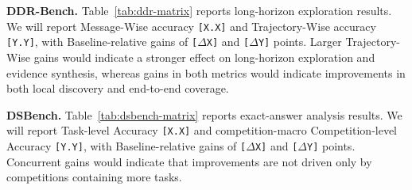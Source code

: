 \documentclass{article}
\begin{document}
\noindent\textbf{DDR-Bench.}
Table~\ref{tab:ddr-matrix} reports long-horizon exploration results.
We will report Message-Wise accuracy \texttt{[X.X]} and Trajectory-Wise accuracy \texttt{[Y.Y]}, with Baseline-relative gains of \texttt{[$\Delta$X]} and \texttt{[$\Delta$Y]} points.
Larger Trajectory-Wise gains would indicate a stronger effect on long-horizon exploration and evidence synthesis, whereas gains in both metrics would indicate improvements in both local discovery and end-to-end coverage.

\noindent\textbf{DSBench.}
Table~\ref{tab:dsbench-matrix} reports exact-answer analysis results.
We will report Task-level Accuracy \texttt{[X.X]} and competition-macro Competition-level Accuracy \texttt{[Y.Y]}, with Baseline-relative gains of \texttt{[$\Delta$X]} and \texttt{[$\Delta$Y]} points.
Concurrent gains would indicate that improvements are not driven only by competitions containing more tasks.
\end{document}
